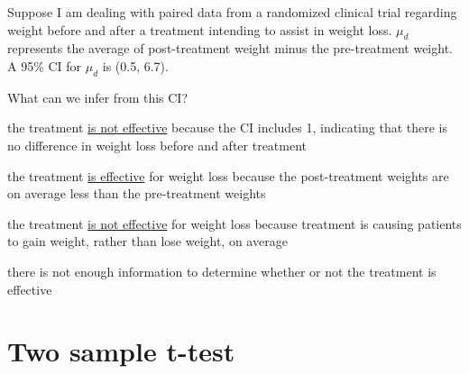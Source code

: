 \begin{frame}
Suppose I am dealing with paired data from a randomized clinical trial regarding weight before and after a treatment intending to assist in weight loss.  $\mu_d$ represents the average of post-treatment weight minus the pre-treatment weight.  A 95\% CI for $\mu_d$ is (0.5, 6.7).
\begin{clicker}{What can we infer from this CI?}
\begin{enumerate}
    \footnotesize{
    \item
    the treatment \underline{is not effective} because the CI includes 1, indicating that there is no difference in weight loss before and after treatment
    \item
    the treatment \underline{is effective} for weight loss because the post-treatment weights are on average less than the pre-treatment weights
    \item
    the treatment \underline{is not effective} for weight loss because treatment is causing patients to gain weight, rather than lose weight, on average
    \item
    there is not enough information to determine whether or not the treatment is effective}
\end{enumerate}
\end{clicker}
\end{frame}





\section[Two sample t-test]{Two sample t-test}
\begin{frame}
\end{frame}

